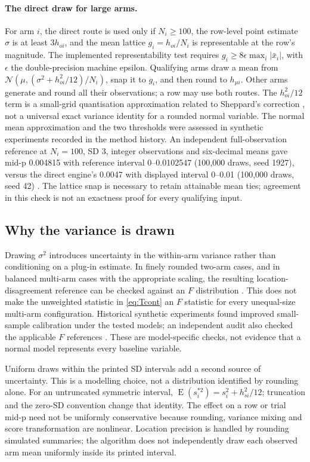 \documentclass[11pt,a4paper]{article}
\DeclareMathOperator{\E}{E}
\begin{document}
\paragraph{The direct draw for large arms.} For arm $i$, the direct route is used only if $N_i\ge100$, the row-level point estimate $\widehat\sigma$ is at least $3h_{o i}$, and the mean lattice $g_i=h_{o i}/N_i$ is representable at the row's magnitude. The implemented representability test requires $g_i\ge 8\epsilon\max_i|\bar x_i|$, with $\epsilon$ the double-precision machine epsilon. Qualifying arms draw a mean from $\mathcal N(\mu,(\sigma^2+h_{o i}^2/12)/N_i)$, snap it to $g_i$, and then round to $h_{\mu i}$. Other arms generate and round all their observations; a row may use both routes. The $h_{o i}^2/12$ term is a small-grid quantisation approximation related to Sheppard's correction \citep{sheppard1898}, not a universal exact variance identity for a rounded normal variable. The normal mean approximation and the two thresholds were assessed in synthetic experiments recorded in the method history. An independent full-observation reference at $N_i=100$, SD 3, integer observations and six-decimal means gave mid-p 0.004815 with reference interval 0--0.0102547 (100,000 draws, seed 1927), versus the direct engine's 0.0047 with displayed interval 0--0.01 (100,000 draws, seed 42) \citep{audit2026full}. The lattice snap is necessary to retain attainable mean ties; agreement in this check is not an exactness proof for every qualifying input.

\subsection{Why the variance is drawn}

Drawing $\sigma^2$ introduces uncertainty in the within-arm variance rather than conditioning on a plug-in estimate. In finely rounded two-arm cases, and in balanced multi-arm cases with the appropriate scaling, the resulting location-disagreement reference can be checked against an $F$ distribution \citep{fisher1924}. This does not make the unweighted statistic in \eqref{eq:Tcont} an $F$ statistic for every unequal-size multi-arm configuration. Historical synthetic experiments found improved small-sample calibration under the tested models; an independent audit also checked the applicable $F$ references \citep{audit2026full}. These are model-specific checks, not evidence that a normal model represents every baseline variable.

Uniform draws within the printed SD intervals add a second source of uncertainty. This is a modelling choice, not a distribution identified by rounding alone. For an untruncated symmetric interval, $\E(s_i^{*2})=s_i^2+h_{s i}^2/12$; truncation and the zero-SD convention change that identity. The effect on a row or trial mid-p need not be uniformly conservative because rounding, variance mixing and score transformation are nonlinear. Location precision is handled by rounding simulated summaries; the algorithm does not independently draw each observed arm mean uniformly inside its printed interval.
\end{document}
